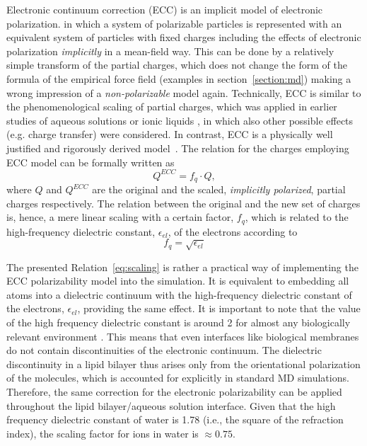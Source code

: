 Electronic continuum correction (ECC) is an implicit model of electronic polarization. 
in which a system of polarizable particles is represented
with an equivalent system of particles with fixed charges
including the effects of electronic polarization \emph{implicitly} in a mean-field way. \citep{leontyev09, leontyev10, leontyev11, leontyev14}
This can be done by a relatively simple transform of the partial charges,
which does not change the form of the formula of the empirical force field (examples in section~\ref{section:md})
making a wrong impression of a \emph{non-polarizable} model again. 
Technically, ECC is similar to the phenomenological scaling of partial charges, 
which was applied in earlier studies of aqueous solutions or ionic liquids \citep{jonsson86,egberts94,beichel14},
in which also other possible effects (e.g. charge transfer) were considered.
In contrast, ECC is a physically well justified and rigorously derived model~\citep{leontyev09, leontyev10, leontyev11, leontyev14}.
The relation for the charges employing ECC model can be formally written as
\begin{equation}  \label{eq:scaling}
 Q^{ECC} = f_q \cdot Q ,
\end{equation} 
where $Q$ and $Q^{ECC}$ are the original and the scaled, \emph{implicitly polarized}, partial charges respectively. 
The relation between the original and the new set of charges 
is, hence, a mere linear scaling with a certain factor, $f_q$, 
which is related to the high-frequency dielectric constant, $\epsilon _{el}$, of the electrons according to
\begin{equation}   \label{eq:scaling_factor}
 f_q = \sqrt{ \epsilon _{el} }
\end{equation} 

The presented Relation~\ref{eq:scaling} is rather a practical way of implementing the ECC polarizability model into the simulation. 
It is equivalent to embedding all atoms into a dielectric continuum 
with the high-frequency dielectric constant of the electrons, $\epsilon _{el}$, providing the same effect.
It is important to note that the value of the high frequency dielectric constant  
is around 2 for almost any biologically relevant environment \citep{leontyev11}. 
This means that even interfaces like biological membranes do not contain discontinuities of the electronic continuum. 
The dielectric discontinuity in a lipid bilayer thus arises only 
from the orientational polarization of the molecules, which is accounted for explicitly in standard MD simulations.  
Therefore, the same correction for the electronic polarizability can be  
applied throughout the lipid bilayer/aqueous solution interface. 
Given that the  high frequency dielectric constant of water is 1.78 (i.e., the square of the refraction index), 
the scaling factor for ions in water is $\approx 0.75$. 






